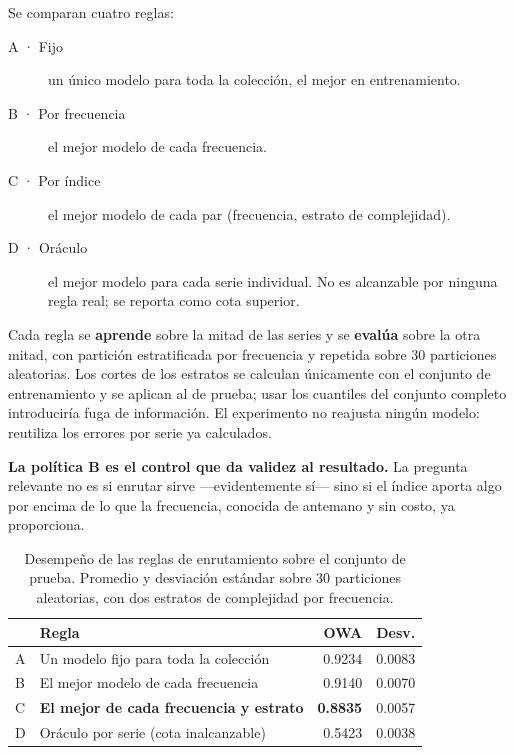 Se comparan cuatro reglas:

\begin{description}
\item[A · Fijo] un único modelo para toda la colección, el mejor en entrenamiento.
\item[B · Por frecuencia] el mejor modelo de cada frecuencia.
\item[C · Por índice] el mejor modelo de cada par (frecuencia, estrato de complejidad).
\item[D · Oráculo] el mejor modelo para cada serie individual. No es alcanzable por
      ninguna regla real; se reporta como cota superior.
\end{description}

Cada regla se \textbf{aprende} sobre la mitad de las series y se \textbf{evalúa}
sobre la otra mitad, con partición estratificada por frecuencia y repetida sobre 30
particiones aleatorias. Los cortes de los estratos se calculan únicamente con el
conjunto de entrenamiento y se aplican al de prueba; usar los cuantiles del conjunto
completo introduciría fuga de información. El experimento no reajusta ningún modelo:
reutiliza los errores por serie ya calculados.

\textbf{La política B es el control que da validez al resultado.} La pregunta
relevante no es si enrutar sirve ---evidentemente sí--- sino si el índice aporta algo
por encima de lo que la frecuencia, conocida de antemano y sin costo, ya proporciona.

\begin{table}[htbp]
\centering
\caption{Desempeño de las reglas de enrutamiento sobre el conjunto de prueba.
Promedio y desviación estándar sobre 30 particiones aleatorias, con dos estratos de
complejidad por frecuencia.}
\label{tab:enrutamiento}
\begin{tabular}{llrr}
\toprule
& \textbf{Regla} & \textbf{OWA} & \textbf{Desv.} \\
\midrule
A & Un modelo fijo para toda la colección   & 0.9234 & 0.0083 \\
B & El mejor modelo de cada frecuencia      & 0.9140 & 0.0070 \\
C & \textbf{El mejor de cada frecuencia y estrato} & \textbf{0.8835} & 0.0057 \\
\midrule
D & Oráculo por serie (cota inalcanzable)   & 0.5423 & 0.0038 \\
\bottomrule
\end{tabular}
\end{table}

